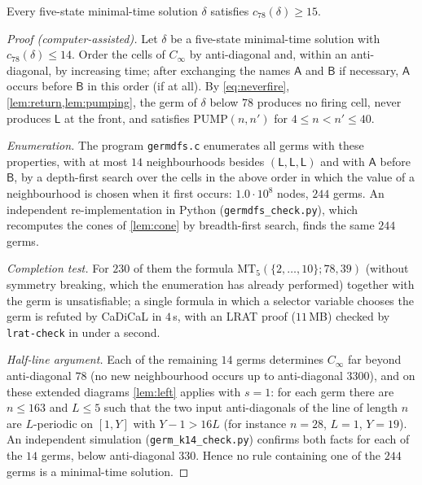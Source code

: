 \begin{proposition}\label{prop:germs}
Every five-state minimal-time solution $\delta$ satisfies $c_{78}(\delta)\ge15$.
\end{proposition}

\begin{proof}[Proof (computer-assisted)]
Let $\delta$ be a five-state minimal-time solution with $c_{78}(\delta)\le14$.
Order the cells of $C_\infty$ by anti-diagonal and, within an anti-diagonal,
by increasing time; after exchanging the names $\mathsf A$ and $\mathsf B$
if necessary, $\mathsf A$ occurs before $\mathsf B$ in this order (if at
all). By \eqref{eq:neverfire}, \cref{lem:return,lem:pumping}, the germ of
$\delta$ below $78$ produces no firing cell, never produces $\mathsf L$ at
the front, and satisfies $\mathrm{PUMP}(n,n')$ for $4\le n<n'\le40$.

\emph{Enumeration.} The program \texttt{germdfs.c} enumerates all germs
with these properties, with at most $14$ neighbourhoods besides
$(\mathsf L,\mathsf L,\mathsf L)$ and with $\mathsf A$ before $\mathsf B$,
by a depth-first search over the cells in the above order in which the
value of a neighbourhood is chosen when it first occurs: $1.0\cdot10^8$
nodes, $244$ germs. An independent re-implementation in Python
(\texttt{germdfs\_check.py}), which recomputes the cones of \cref{lem:cone}
by breadth-first search, finds the same $244$ germs.

\emph{Completion test.} For $230$ of them the formula $\mathrm{MT}_5(\{2,\dots,10\};78,39)$ (without symmetry breaking,
which the enumeration has already performed) together with the germ is
unsatisfiable; a single formula in which a selector variable chooses the
germ is refuted by CaDiCaL in $4$\,s, with an LRAT proof ($11$\,MB) checked
by \texttt{lrat-check} in under a second.

\emph{Half-line argument.} Each of the remaining $14$ germs determines $C_\infty$ far beyond anti-diagonal $78$ (no new neighbourhood
occurs up to anti-diagonal $3300$), and on these extended diagrams
\cref{lem:left} applies with $s=1$: for each germ there are $n\le163$ and
$L\le5$ such that the two input anti-diagonals of the line of length $n$ are
$L$-periodic on $[1,Y]$ with $Y-1>16L$ (for instance $n=28$, $L=1$, $Y=19$).
An independent simulation (\texttt{germ\_k14\_check.py}) confirms both facts
for each of the $14$ germs, below anti-diagonal $330$.
Hence no rule containing one of the $244$ germs is a minimal-time solution.
\end{proof}

